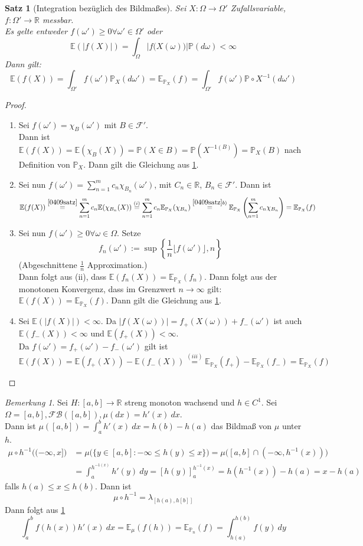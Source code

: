 \documentclass[10pt,a4paper]{article}
\newcommand{\R}{\ensuremath{\mathbb{R}}}
\newcommand{\la}{\ensuremath{\lambda}}
\newcommand{\Bor}{\mathscr B}
\newcommand{\Prb}{\mathbb P}
\newcommand{\Epv}{\ensuremath{\mathbb{E}}}
\newcommand{\scF}{\ensuremath{\mathscr{F}}}
\theoremstyle{plain}
\newtheorem{satz}[theorem]{Satz}
\theoremstyle{definition}
\theoremstyle{remark}
\newtheorem{bem}[theorem]{Bemerkung}
\begin{document}
	\begin{satz}[Integration bezüglich des Bildmaßes]\label{0417satz}
		Sei $X:\Omega\to\Omega'$ Zufallsvariable, $f:\Omega'\to\R$ messbar.\\
		Es gelte entweder $f(\omega')\geq 0\forall\omega'\in\Omega'$ oder
		\[\Epv\left(|f(X)|\right)=\int_\Omega|f\big(X(\omega)\big)|\Prb(d\omega)<\infty\]
		Dann gilt:
		\[\Epv(f(X))=\int_{\Omega'}f(\omega')\Prb_X(d\omega')=\Epv_{\Prb_X}(f)=\int_{\Omega'}f(\omega')\Prb\circ X^{-1}(d\omega')\]
	\end{satz}
	\begin{proof}
		\begin{enumerate}[label=(\roman*)]
			\item Sei $f(\omega')=\chi_B(\omega')$ mit $B\in\scF'$.\\
			Dann ist $\Epv(f(X))=\Epv(\chi_B(X))=\Prb(X\in B)=\Prb(X^{-1(B)})=\Prb_X(B)$ nach Definition von $\Prb_X$. Dann gilt die Gleichung aus \ref{0417satz}.
			\item Sei nun $f(\omega')=\sum_{n=1}^{m}c_n\chi_{B_n}(\omega')$, mit $C_n\in\R$, $B_n\in\scF'$.
			Dann ist
			\[\Epv(f(X))\overset{\ref{0409satz}}{=}\sum_{n=1}^{m}c_n\Epv(\chi_{B_n}(X))\overset{(i)}{=}\sum_{n=1}^{m}c_n\Epv_{\Prb_X}(\chi_{B_n})\overset{\ref{0409satz}b)}{=}\Epv_{\Prb_X}\left(\sum_{n=1}^{m}c_n\chi_{B_n}\right)=\Epv_{\Prb_X}(f)\]
			\item Sei nun $f(\omega')\geq 0\forall\omega\in\Omega$. Setze 
			\[f_n(\omega'):=\sup\left\{\frac{1}{n}\lfloor f(\omega')\rfloor,n\right\}\]
			(Abgeschnittene $\frac{1}{n}$ Approximation.)\\
			Dann folgt aus (ii), dass $\Epv(f_n(X))=\Epv_{\Prb_X}(f_n)$. Dann folgt aus der monotonen Konvergenz, dass im Grenzwert $n\to\infty$ gilt: $\Epv(f(X))=\Epv_{\Prb_X}(f)$. Dann gilt die Gleichung aus \ref{0417satz}.
			\item Sei $\Epv(|f(X)|)<\infty$. Da $|f(X(\omega))|=f_+(X(\omega))+f_-(\omega')$ ist auch $\Epv(f_-(X))<\infty$ und $\Epv(f_+(X))<\infty$.\\
			Da $f(\omega')=f_+(\omega')-f_-(\omega')$ gilt ist 
			\[\Epv(f(X))=\Epv(f_+(X))-\Epv(f_-(X))\overset{(iii)}{=}\Epv_{\Prb_X}(f_+)-\Epv_{\Prb_X}(f_-)=\Epv_{\Prb_X}(f)\]
		\end{enumerate}
	\end{proof}

	\begin{bem}
	 	Sei $H:[a,b]\to\R$ streng monoton wachsend und $h\in C^1$. Sei $\Omega=[a,b],\scF\Bor([a,b]),\mu(dx)=h'(x)~dx$.\\
		Dann ist $\mu([a,b])=\int_{a}^{b}h'(x)~dx=h(b)-h(a)$ das Bildmaß von $\mu$ unter $h$.
		\begin{align*}
		\mu\circ h^{-1}\big((-\infty,x]\big)&=\mu\big(\{y\in[a,b]:-\infty\leq h(y)\leq x\}\big)=\mu\big([a,b]\cap(-\infty,h^{-1}(x))\big)\\
		&=\int_{a}^{h^{-1(x)}}h'(y)~dy=\left[h(y)\right]_a^{h^{-1}(x)}=h(h^{-1}(x))-h(a)=x-h(a)
		\end{align*}
		falls $h(a)\leq x\leq h(b)$. Dann ist
		\[\mu\circ h^{-1}=\la_{[h(a),h[b]]}\]
		Dann folgt aus \ref{0417satz}
		\[\int_{a}^{b}f(h(x))h'(x)~dx=\Epv_\mu(f(h))=\Epv_{\Prb_n}(f)=\int_{h(a)}^{h(b)}f(y)~dy\]
	\end{bem}
\end{document}
